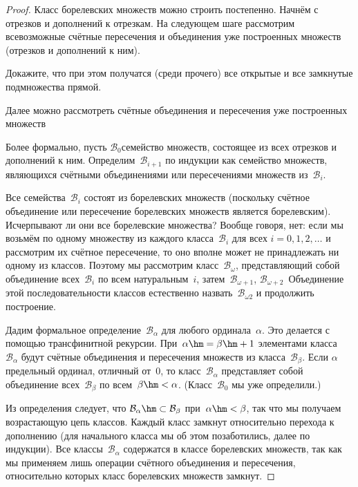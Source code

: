 \begin{proof}
Класс борелевских множеств можно строить постепенно. Начнём с
отрезков и дополнений к отрезкам. На следующем шаге рассмотрим
всевозможные счётные пересечения и объединения уже построенных
множеств (отрезков и дополнений к ним).

\begin{problem}
Докажите, что при этом получатся (среди прочего) все открытые
и все замкнутые подмножества прямой.
\end{problem}

\problskip
Далее можно рассмотреть счётные объединения и пересечения
уже построенных множеств~

Более формально, пусть $\mathcal{B}_0$\т семейство множеств,
состоящее из всех отрезков и дополнений к ним. Определим~$\mathcal{B}_{i+1}$
по индукции как семейство множеств, являющихся
счётными объединениями или пересечениями множеств из~$\mathcal{B}_i$.

Все семейства~$\mathcal{B}_i$ состоят из борелевских множеств
(поскольку счётное объединение или пересечение борелевских
множеств является борелевским). Исчерпывают ли они все
борелевские множества? Вообще говоря, нет: если мы возьмём по
одному множеству из каждого класса~$\mathcal{B}_i$
для всех $i=0,1,2,\dots$ и рассмотрим их
счётное пересечение, то оно вполне может не принадлежать ни
одному из классов. Поэтому мы рассмотрим класс~$\mathcal{B}_\omega$,
представляющий собой объединение всех~$\mathcal{B}_i$ по всем
натуральным~$i$, затем~$\mathcal{B}_{\omega+1}$,
$\mathcal{B}_{\omega+2}$~ Объединение этой последовательности
классов естественно
назвать~$\mathcal{B}_{\omega2}$ и продолжить построение.

Дадим формальное определение~$\mathcal{B}_\alpha$%
для любого ординала~$\alpha$. Это делается с
помощью трансфинитной рекурсии. При~$\alpha\hm=\beta\hm+1$
элементами класса~$\mathcal{B}_{\alpha}$ будут счётные объединения и
пересечения множеств из класса~$\mathcal{B}_\beta$. Если $\alpha$\т
предельный ординал, отличный от~$0$, то класс~$\mathcal{B}_\alpha$
представляет собой объединение всех~$\mathcal{B}_\beta$ по
всем~$\beta\hm<\alpha$. (Класс~$\mathcal{B}_0$ мы уже определили.)

Из определения следует, что $\mathcal{B}_\alpha \hm\subset
\mathcal{B}_\beta$ при~$\alpha\hm<\beta$, так что мы получаем
возрастающую цепь классов. Каждый класс замкнут относительно
перехода к дополнению (для начального класса мы об этом
позаботились, далее по индукции). Все классы~$\mathcal{B}_{\alpha}$
содержатся в классе борелевских множеств, так как мы применяем
лишь операции счётного объединения и пересечения, относительно
которых класс борелевских множеств замкнут.


\end{proof}
